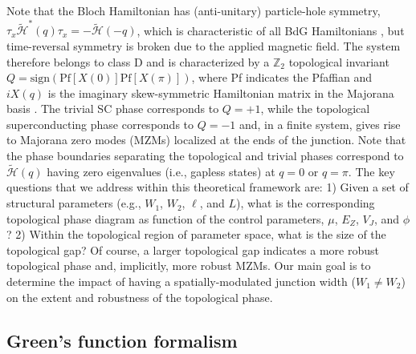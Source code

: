 \documentclass[twocolumn,aps,prb,nofootinbib]{revtex4-2}
\begin{document}
Note that the Bloch Hamiltonian has (anti-unitary) particle-hole symmetry, $\tau_x \widetilde{\mathcal{H}}^*(q) \tau_x = -\widetilde{\mathcal{H}}(-q)$, which is characteristic of all BdG Hamiltonians \cite{Chiu2016}, but time-reversal symmetry is broken due to the applied magnetic field. The system therefore belongs to class D and is characterized by a $\mathbb{Z}_2$ topological invariant $Q = \text{sign}\left(\text{Pf}[X(0)]\text{Pf}[X(\pi)]\right)$, where Pf indicates the Pfaffian and $iX(q)$ is the imaginary skew-symmetric Hamiltonian matrix in the Majorana basis \cite{Chiu2016}. The trivial SC phase corresponds to $Q = +1$, while the topological superconducting phase corresponds to $Q = -1$ and, in a finite system, gives rise to Majorana zero modes (MZMs) localized at the ends of the junction. Note that the phase boundaries separating the topological and trivial phases correspond to $\widetilde{\mathcal{H}}(q)$ having zero eigenvalues (i.e., gapless states) at $q=0$ or $q=\pi$. 
The key questions that we address within this theoretical framework are: 1) Given a set of structural parameters (e.g., $W_1$, $W_2$, $\ell$, and $L$), what is the corresponding topological phase diagram as function of the control parameters, $\mu$, $E_Z$, $V_J$, and $\phi$? 2) Within the topological region of parameter space, what is the size of the topological gap? Of course, a larger topological gap indicates a more robust topological phase and, implicitly, more robust MZMs.
Our main goal is to determine the impact of having a spatially-modulated junction width ($W_1\neq W_2$) on the extent and robustness of the topological phase.  

\subsection{Green's function formalism}
\end{document}
